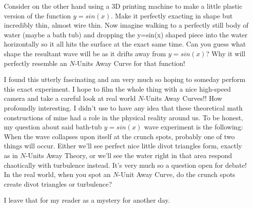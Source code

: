 Consider on the other hand using a 3D printing machine to make a little plastic version of the function $y = sin(x)$. Make it perfectly exacting in shape but incredibly thin, almost wire thin. Now imagine walking to a perfectly still body of water (maybe a bath tub) and dropping the y=sin(x) shaped piece into the water horizontally so it all hits the surface at the exact same time. Can you guess what shape the resultant wave will be as it drifts away from $y = sin(x)$? Why it will perfectly resemble an $N$-Units Away Curve for that function!

I found this utterly fascinating and am very much so hoping to someday perform this exact experiment. I hope to film the whole thing with a nice high-speed camera and take a careful look at real world $N$-Units Away Curves!! How profoundly interesting. I didn't use to have any idea that these theoretical math constructions of mine had a role in the physical reality around us. To be honest, my question about said bath-tub $y = sin(x)$ wave experiment is the
following: When the wave collapses upon itself at the crunch spots, probably one of two things will occur. Either we’ll see perfect nice little divot triangles form, exactly as in $N$-Units Away Theory, or we’ll see the water right in that area respond chaotically with turbulence instead. It’s very much so a question open for debate! In the real world, when you spot an $N$-Unit Away Curve, do the crunch spots create divot triangles or turbulence?

I leave that for my reader as a mystery for another day.